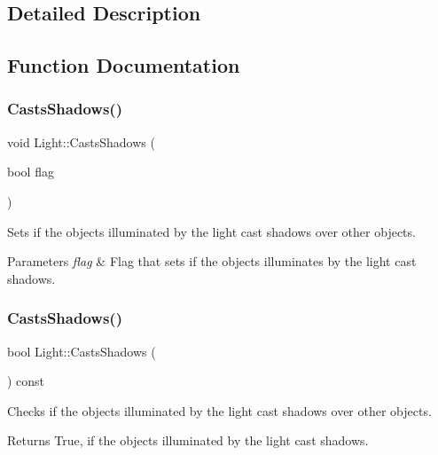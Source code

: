 \subsection{Detailed Description}


\subsection{Function Documentation}
\hypertarget{group___lights_ga87d9f95e8a6d77b8fd8383b68daa23ff}{}\label{group___lights_ga87d9f95e8a6d77b8fd8383b68daa23ff} 
\subsubsection{\texorpdfstring{Casts\+Shadows()}{CastsShadows()}\hspace{0.1cm}{\footnotesize\ttfamily [1/2]}}
{\footnotesize\ttfamily void Light\+::\+Casts\+Shadows (\begin{DoxyParamCaption}\item[{bool}]{flag }\end{DoxyParamCaption})\hspace{0.3cm}{\ttfamily [inline]}}

Sets if the objects illuminated by the light cast shadows over other objects. 
\begin{DoxyParams}{Parameters}
{\em flag} & Flag that sets if the objects illuminates by the light cast shadows. \\
\hline
\end{DoxyParams}
\hypertarget{group___lights_gad1397ab09ba91ed92dbbeb0c8fa8bedc}{}\label{group___lights_gad1397ab09ba91ed92dbbeb0c8fa8bedc} 
\subsubsection{\texorpdfstring{Casts\+Shadows()}{CastsShadows()}\hspace{0.1cm}{\footnotesize\ttfamily [2/2]}}
{\footnotesize\ttfamily bool Light\+::\+Casts\+Shadows (\begin{DoxyParamCaption}{ }\end{DoxyParamCaption}) const\hspace{0.3cm}{\ttfamily [inline]}}

Checks if the objects illuminated by the light cast shadows over other objects. \begin{DoxyReturn}{Returns}
True, if the objects illuminated by the light cast shadows. 
\end{DoxyReturn}
\hypertarget{group___lights_ga460c4d38eba389fd8e13d994249bbafc}{}\label{group___lights_ga460c4d38eba389fd8e13d994249bbafc} 
